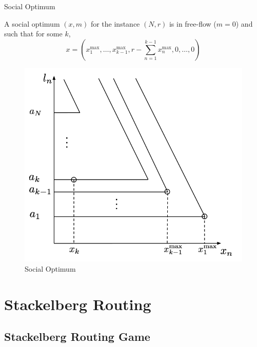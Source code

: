 \documentclass[xcolor=svgnames, english, smaller]{beamer}
\theoremstyle{plain}
\theoremstyle{definition}
\theoremstyle{plain}
\theoremstyle{plain}
\begin{document}
\begin{frame}{Social Optimum}

A social optimum $(x, m)$ for the instance $(N, r)$ is in free-flow ($m = 0$) and such that for some $k$,
\[
x = (x_1^{\max}, \dots, x_{k-1}^{\max}, r - \sum_{n = 1}^{k-1} x_n^{\max}, 0, \dots, 0)
\]


\begin{figure}
\centering
\includegraphics[scale=0.22]{../../figures/presentation/social_opt.png}
\caption{Social Optimum}
\end{figure}


\end{frame}



\section{Stackelberg Routing}

\subsection{Stackelberg Routing Game}
\end{document}
